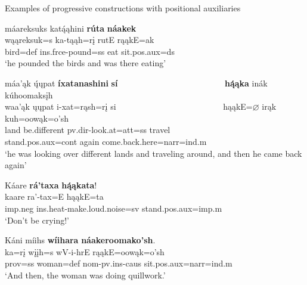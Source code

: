 \begin{exe}
    \item\label{Ch5ProgressivePositionals} Examples of progressive constructions with positional auxiliaries

    \begin{xlist}
        \item\label{Ch5ProgressivePositionalsA} \glll máareksuks katą́ąhini \textbf{rúta} \textbf{náakek}\\
        wąąreksuk=s ka-tąąh=rį rutE rąąkE=ak\\
        \textnormal{bird}=def ins.frce-\textnormal{pound}=ss \textnormal{eat} \textnormal{sit}.pos.aux=ds\\
        \glt `he pounded the birds and was there eating' \citep[146]{hollow1973a}

        \item\label{Ch5ProgressivePositionalsB} \glll máa'ąk ų́ųpat \textbf{íxatanashini} \textbf{sí} ~ ~ ~ ~ ~ ~ ~ ~ ~ ~ ~ ~ ~ ~ ~ \textbf{hą́ąka} inák kúhoomaksįh\\
        waa'ąk ųųpat i-xat=rąsh=rį si ~ ~ ~ ~ ~ ~ ~ ~ ~ ~ ~ ~ ~ ~ ~ hąąkE=$\varnothing$ irąk kuh=oowąk=o'sh\\
        \textnormal{land} \textnormal{be.different} pv.dir-\textnormal{look.at}=att=ss \textnormal{travel} ~ ~ ~ ~ ~ ~ ~ ~ ~ ~ ~ ~ ~ ~ ~ \textnormal{stand}.pos.aux=cont \textnormal{again} \textnormal{come.back.here}=narr=ind.m\\
        \glt `he was looking over different lands and traveling around, and then he came back again' \citep[8]{hollow1973a}

        \item\label{Ch5ProgressivePositionalsC} \glll Káare \textbf{rá'taxa} \textbf{hą́ąkata}!\\
        kaare ra'-tax=E hąąkE=ta\\
        imp.neg ins.heat-\textnormal{make.loud.noise}=sv \textnormal{stand}.pos.aux=imp.m\\
        \glt `Don't be crying!' \citep[322]{hollow1973b}

        \item\label{Ch5ProgressivePositionalsD} \glll Káni míihs \textbf{wíihara} \textbf{náakeroomako'sh}.\\
        ka=rį wįįh=s wV-i-hrE rąąkE=oowąk=o'sh\\
        prov=ss \textnormal{woman}=def nom-pv.ins-caus \textnormal{sit}.pos.aux=narr=ind.m\\
        \glt `And then, the woman was doing quillwork.' \citep[46]{hollow1973b}

    \end{xlist}
\end{exe}

